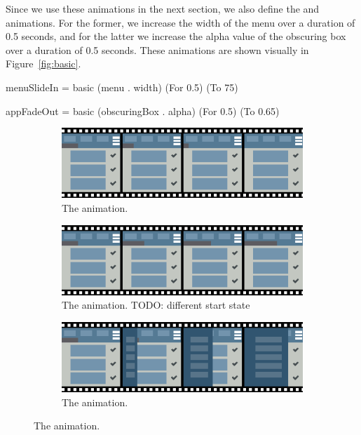 Since we use these animations in the next section, we also define the  and  animations. For the former, we increase the width of the menu over a duration of 0.5 seconds, and for the latter we increase the alpha value of the obscuring box over a duration of 0.5 seconds. These animations are shown visually in Figure~\ref{fig:basic}.

\begin{spec}
menuSlideIn = basic (menu . width) (For 0.5) (To 75)

appFadeOut = basic (obscuringBox . alpha) (For 0.5) (To 0.65)
\end{spec}

\begin{figure}[!htbp]
\centering

\begin{subfigure}[h]{\textwidth}
\centering
\includegraphics[width=\figscale\textwidth]{pictures/line1OutroFig}
\caption{The  animation.}
\label{fig:basic1_1}
\end{subfigure}

\begin{subfigure}[h]{\textwidth}
\centering
\includegraphics[width=\figscale\textwidth]{pictures/line2IntroFig}
\caption{The  animation. TODO: different start state}
\label{fig:basic1_2}
\end{subfigure}

\begin{subfigure}[h]{\textwidth}
\centering
\includegraphics[width=\figscale\textwidth]{pictures/menuSlideInFig}
\caption{The  animation.}
\label{fig:basic2_1}
\end{subfigure}


\end{figure}
